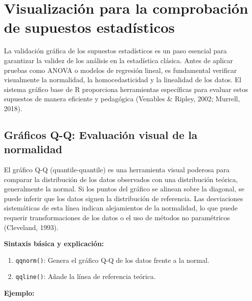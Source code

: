 \documentclass[
  spanish,
  a4paper,
  DIV=11,
  numbers=noendperiod,
  onepage,
  openany]{scrreprt}
\begin{document}
\section{Visualización para la comprobación de supuestos
estadísticos}\label{visualizaciuxf3n-para-la-comprobaciuxf3n-de-supuestos-estaduxedsticos}

La validación gráfica de los supuestos estadísticos es un paso esencial
para garantizar la validez de los análisis en la estadística clásica.
Antes de aplicar pruebas como ANOVA o modelos de regresión lineal, es
fundamental verificar visualmente la normalidad, la homocedasticidad y
la linealidad de los datos. El sistema gráfico base de R proporciona
herramientas específicas para evaluar estos supuestos de manera
eficiente y pedagógica (Venables \& Ripley, 2002; Murrell, 2018).

\subsection{Gráficos Q-Q: Evaluación visual de la
normalidad}\label{gruxe1ficos-q-q-evaluaciuxf3n-visual-de-la-normalidad}

El gráfico Q-Q (quantile-quantile) es una herramienta visual poderosa
para comparar la distribución de los datos observados con una
distribución teórica, generalmente la normal. Si los puntos del gráfico
se alinean sobre la diagonal, se puede inferir que los datos siguen la
distribución de referencia. Las desviaciones sistemáticas de esta línea
indican alejamientos de la normalidad, lo que puede requerir
transformaciones de los datos o el uso de métodos no paramétricos
(Cleveland, 1993).

\textbf{Sintaxis básica y explicación:}

\begin{enumerate}
\def\labelenumi{\arabic{enumi}.}
\item
  \texttt{qqnorm()}: Genera el gráfico Q-Q de los datos frente a la
  normal.
\item
  \texttt{qqline()}: Añade la línea de referencia teórica.
\end{enumerate}

\textbf{Ejemplo:}
\end{document}

